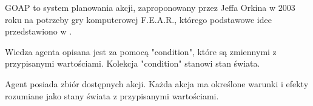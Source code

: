 
GOAP to system planowania akcji, zaproponowany przez Jeffa Orkina w 2003 roku na potrzeby gry komputerowej F.E.A.R., którego podstawowe idee przedstawiono w \cite{ORKI}. 



Wiedza agenta opisana jest za pomocą "condition", które są zmiennymi z przypisanymi wartościami. Kolekcja "condition" stanowi stan świata. %

Agent posiada zbiór dostępnych akcji. Każda akcja ma określone warunki i efekty rozumiane jako stany świata z przypisanymi wartościami. 








% 